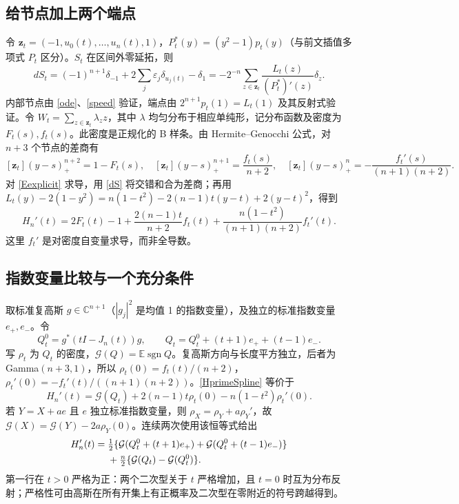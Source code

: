 \documentclass[11pt,a4paper,fontset=fandol]{ctexart}
\newcommand{\E}{\mathbb E}
\newcommand{\sgn}{\operatorname{sgn}}
\newcommand{\G}{\mathcal G}
\theoremstyle{remark}\newtheorem{conjecture}{猜想}
\begin{document}
\subsection{给节点加上两个端点}
令 $\boldsymbol z_t=(-1,u_0(t),\ldots,u_n(t),1)$，$P_t^*(y)=(y^2-1)p_t(y)$（与前文插值多项式 $P_t$ 区分）。$S_t$ 在区间外零延拓，则
\begin{equation}\label{dS}
 dS_t=(-1)^{n+1}\delta_{-1}+2\sum_j\varepsilon_j\delta_{u_j(t)}-\delta_1
 =-2^{-n}\sum_{z\in\boldsymbol z_t}\frac{L_t(z)}{(P_t^*)'(z)}\delta_z.
\end{equation}
内部节点由 \eqref{ode}、\eqref{speed} 验证，端点由 $2^{n+1}p_t(1)=L_t(1)$ 及其反射式验证。令 $W_t=\sum_{z\in\boldsymbol z_t}\lambda_z z$，其中 $\lambda$ 均匀分布于相应单纯形，记分布函数及密度为 $F_t(s),f_t(s)$。此密度是正规化的 B 样条。由 Hermite--Genocchi 公式，对 $n+3$ 个节点的差商有
\[
 [\boldsymbol z_t](y-s)_+^{n+2}=1-F_t(s),\quad
 [\boldsymbol z_t](y-s)_+^{n+1}=\frac{f_t(s)}{n+2},\quad
 [\boldsymbol z_t](y-s)_+^n=-\frac{f_t'(s)}{(n+1)(n+2)}.
\]
对 \eqref{Eexplicit} 求导，用 \eqref{dS} 将交错和合为差商；再用
$L_t(y)-2(1-y^2)=n(1-t^2)-2(n-1)t(y-t)+2(y-t)^2$，得到
\begin{equation}\label{HprimeSpline}
 H_n'(t)=2F_t(t)-1+\frac{2(n-1)t}{n+2}f_t(t)
 +\frac{n(1-t^2)}{(n+1)(n+2)}f_t'(t).
\end{equation}
这里 $f_t'$ 是对密度自变量求导，而非全导数。

\subsection{指数变量比较与一个充分条件}
取标准复高斯 $g\in\mathbb C^{n+1}$（$|g_j|^2$ 是均值 1 的指数变量），及独立的标准指数变量 $e_+,e_-$。令
\[
 Q_t^0=g^*(tI-J_n(t))g,\qquad Q_t=Q_t^0+(t+1)e_++(t-1)e_-.
\]
写 $\rho_t$ 为 $Q_t$ 的密度，$\G(Q)=\E\sgn Q$。复高斯方向与长度平方独立，后者为 Gamma$(n+3,1)$，所以 $\rho_t(0)=f_t(t)/(n+2)$，$\rho_t'(0)=-f_t'(t)/((n+1)(n+2))$。\eqref{HprimeSpline} 等价于
\begin{equation}\label{HprimeGauss}
 H_n'(t)=\G(Q_t)+2(n-1)t\rho_t(0)-n(1-t^2)\rho_t'(0).
\end{equation}
若 $Y=X+ae$ 且 $e$ 独立标准指数变量，则 $\rho_X=\rho_Y+a\rho_Y'$，故 $\G(X)=\G(Y)-2a\rho_Y(0)$。连续两次使用该恒等式给出
\begin{align}\label{comp}
 H_n'(t)={}&\tfrac12\{\G(Q_t^0+(t+1)e_+)+\G(Q_t^0+(t-1)e_-)\}\notag\\
 &+\tfrac n2\{\G(Q_t)-\G(Q_t^0)\}.
\end{align}
第一行在 $t>0$ 严格为正：两个二次型关于 $t$ 严格增加，且 $t=0$ 时互为分布反射；严格性可由高斯在所有开集上有正概率及二次型在零附近的符号跨越得到。
\end{document}
